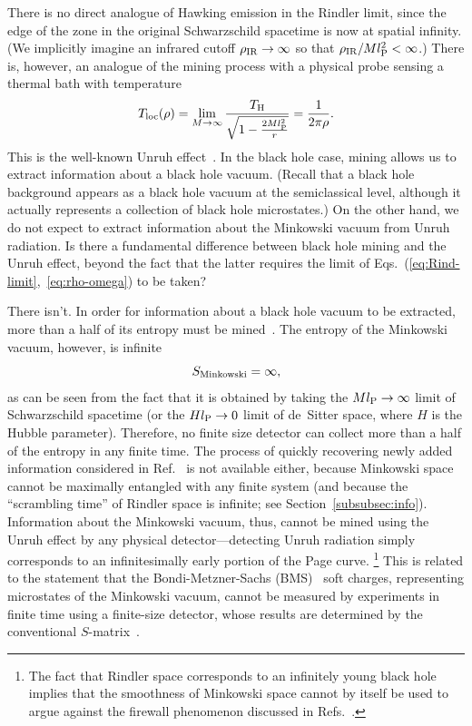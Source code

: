\documentclass[12pt]{article}
\begin{document}
There is no direct analogue of Hawking emission in the Rindler 
limit, since the edge of the zone in the original Schwarzschild 
spacetime is now at spatial infinity.  (We implicitly imagine 
an infrared cutoff $\rho_{\rm IR} \rightarrow \infty$ so that 
$\rho_{\rm IR}/Ml_{\rm P}^2 < \infty$.)  There is, however, an 
analogue of the mining process with a physical probe sensing 
a thermal bath with temperature
%
\begin{equation}
  T_{\rm loc}(\rho) = \lim_{M \rightarrow \infty} 
    \frac{T_{\rm H}}{\sqrt{1-\frac{2Ml_{\rm P}^2}{r}}} 
  = \frac{1}{2\pi \rho}.
\label{eq:Rindler-T}
\end{equation}
%
This is the well-known Unruh effect~\cite{Unruh:1976db,%
Fulling:1972md,Davies:1974th}.  In the black hole case, mining 
allows us to extract information about a black hole vacuum. 
(Recall that a black hole background appears as a black hole 
vacuum at the semiclassical level, although it actually represents 
a collection of black hole microstates.)  On the other hand, 
we do not expect to extract information about the Minkowski 
vacuum from Unruh radiation.  Is there a fundamental 
difference between black hole mining and the Unruh effect, 
beyond the fact that the latter requires the limit of 
Eqs.~(\ref{eq:Rind-limit},~\ref{eq:rho-omega}) to be taken?

There isn't.  In order for information about a black hole 
vacuum to be extracted, more than a half of its entropy must 
be mined~\cite{Page:1993wv}.  The entropy of the Minkowski vacuum, 
however, is infinite
%
\begin{equation}
  S_{\rm Minkowski} = \infty,
\label{eq:S_Minkowski}
\end{equation}
%
as can be seen from the fact that it is obtained by taking the 
$M l_{\rm P} \rightarrow \infty$ limit of Schwarzschild spacetime 
(or the $H l_{\rm P} \rightarrow 0$ limit of de~Sitter space, 
where $H$ is the Hubble parameter).  Therefore, no finite size 
detector can collect more than a half of the entropy in any finite 
time.  The process of quickly recovering newly added information 
considered in Ref.~\cite{Hayden:2007cs} is not available either, 
because Minkowski space cannot be maximally entangled with any 
finite system (and because the ``scrambling time'' of Rindler 
space is infinite; see Section~\ref{subsubsec:info}).  Information 
about the Minkowski vacuum, thus, cannot be mined using the Unruh 
effect by any physical detector---detecting Unruh radiation simply 
corresponds to an infinitesimally early portion of the Page curve.%
\footnote{The fact that Rindler space corresponds to an infinitely 
 young black hole implies that the smoothness of Minkowski space 
 cannot by itself be used to argue against the firewall phenomenon 
 discussed in Refs.~\cite{Almheiri:2012rt,Almheiri:2013hfa,%
 Marolf:2013dba}.}
This is related to the statement that the Bondi-Metzner-Sachs 
(BMS)~\cite{Bondi:1962px,Sachs:1962wk} soft charges, representing 
microstates of the Minkowski vacuum, cannot be measured 
by experiments in finite time using a finite-size detector, 
whose results are determined by the conventional 
$S$-matrix~\cite{Mirbabayi:2016axw,Bousso:2017dny}.
\end{document}

